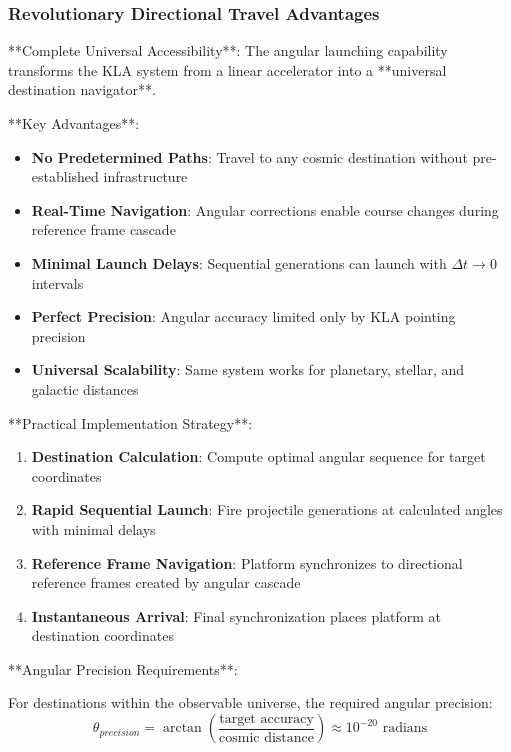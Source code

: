 \documentclass[12pt,a4paper]{article}
\theoremstyle{remark}
\begin{document}
\subsubsection{Revolutionary Directional Travel Advantages}

**Complete Universal Accessibility**: The angular launching capability transforms the KLA system from a linear accelerator into a **universal destination navigator**.

**Key Advantages**:
\begin{itemize}
\item \textbf{No Predetermined Paths}: Travel to any cosmic destination without pre-established infrastructure
\item \textbf{Real-Time Navigation}: Angular corrections enable course changes during reference frame cascade
\item \textbf{Minimal Launch Delays}: Sequential generations can launch with $\Delta t \rightarrow 0$ intervals
\item \textbf{Perfect Precision}: Angular accuracy limited only by KLA pointing precision
\item \textbf{Universal Scalability}: Same system works for planetary, stellar, and galactic distances
\end{itemize}

**Practical Implementation Strategy**:

\begin{enumerate}
\item \textbf{Destination Calculation}: Compute optimal angular sequence for target coordinates
\item \textbf{Rapid Sequential Launch}: Fire projectile generations at calculated angles with minimal delays
\item \textbf{Reference Frame Navigation}: Platform synchronizes to directional reference frames created by angular cascade
\item \textbf{Instantaneous Arrival}: Final synchronization places platform at destination coordinates
\end{enumerate}

**Angular Precision Requirements**:

For destinations within the observable universe, the required angular precision:
\begin{equation}
\theta_{precision} = \arctan\left(\frac{\text{target accuracy}}{\text{cosmic distance}}\right) \approx 10^{-20} \text{ radians}
\end{equation}
\end{document}
